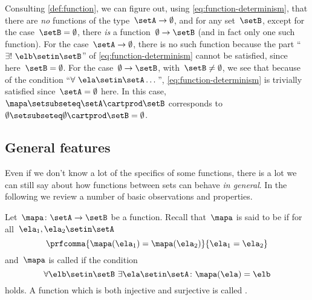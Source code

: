 Consulting \cref{def:function}, we can figure out, using \cref{eq:function-determinism}, that there are \emph{no} functions of the type~$\setA \to \emptyset$, and for any set~$\setB$, except for the case~$\setB = \emptyset$, there \emph{is} a function~$\emptyset \to \setB$ (and in fact only one such function).
For the case~$\setA \to \emptyset$, there is no such function because the part ``$\exists ! \ \elb \setin\setB$'' of \cref{eq:function-determinism} cannot be satisfied, since here~$\setB = \emptyset$.
For the case~$\emptyset \to \setB$, with~$\setB \neq \emptyset$, we see that because of the condition ``$\forall \ \ela \setin\setA \dots$'', \cref{eq:function-determinism} is trivially satisfied since~$\setA = \emptyset$ here.
In this case,~$\mapa \setsubseteq \setA \cartprod \setB$ corresponds to~$\emptyset \setsubseteq \emptyset \cartprod \setB = \emptyset$.

\subsection{General features}

Even if we don't know a lot of the specifics of some functions, there is a lot we can still say about how functions between sets can behave \emph{in general}.
In the following we review a number of basic observations and properties.

Let~$\mapa\colon \setA \to \setB$ be a function.
Recall that~$\mapa$ is said to be \emph{} if for all~$\ela_1, \ela_2 \setin\setA$
\begin{equation}
    \label{eq:injectivity-cond}
    \prfcomma{\mapa(\ela_1) = \mapa(\ela_2)}{\ela_1 = \ela_2}
\end{equation}
and~$\mapa$ is called \emph{} if the condition
\begin{equation}
    \label{eq:surjectivity-cond}
    \forall \elb \setin\setB \ \exists  \ela \setin\setA \colon \mapa(\ela) = \elb
\end{equation}
holds.
A function which is both injective and surjective is called \emph{}.


